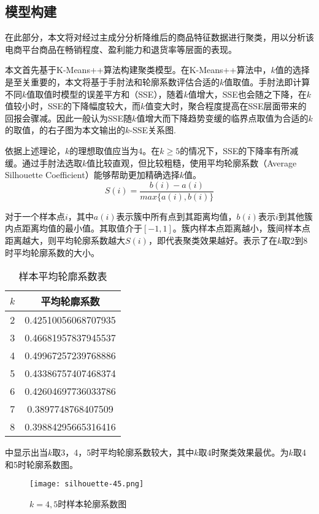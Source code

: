 \documentclass[lang=cn,11pt,a4paper,cite=authoryear]{elegantpaper}
\begin{document}
\subsection{模型构建}
在此部分，本文将对经过主成分分析降维后的商品特征数据进行聚类，用以分析该电商平台商品在畅销程度、盈利能力和退货率等层面的表现。

本文首先基于K-Means++算法构建聚类模型。在K-Means++算法中，$k$值的选择是至关重要的，本文将基于手肘法和轮廓系数评估合适的$k$值取值。手肘法即计算不同$k$值取值时模型的误差平方和（SSE），随着$k$值增大，SSE也会随之下降，在$k$值较小时，SSE的下降幅度较大，而$k$值变大时，聚合程度提高在SSE层面带来的回报会骤减。因此一般认为SSE随$k$值增大而下降趋势变缓的临界点取值为合适的$k$的取值，的右子图为本文输出的$k$-SSE关系图.

依据上述理论，$k$的理想取值应当为4。在$k \geqslant 5$的情况下，SSE的下降率有所减缓。通过手肘法选取$k$值比较直观，但比较粗糙，使用平均轮廓系数（Average Silhouette Coefficient）能够帮助更加精确选择$k$值。
\begin{equation}
  S(i) = \frac{b(i)-a(i)}{max \{a(i), b(i) \}}
\end{equation}

对于一个样本点$i$，其中$a(i)$表示簇中所有点到其距离均值，$b(i)$表示$i$到其他簇内点距离均值的最小值。其取值介于$[-1, 1]$。簇内样本点距离越小，簇间样本点距离越大，则平均轮廓系数越大$S(i)$，即代表聚类效果越好。表示了在$k$取2到8时平均轮廓系数的大小。
\begin{table}[!htb]
  \centering
  \caption{样本平均轮廓系数表}
    \huge
    \begin{tabular}{c|c}
    \hline
    \textbf{$k$} & \textbf{平均轮廓系数} \\
    \hline
    2 & 0.42510056068707935 \\
    3 & 0.46681957837945537 \\
    4 & 0.49967257239768886 \\
    5 & 0.43386757407468374 \\
    6 & 0.42604697736033786 \\
    7 & 0.3897748768407509  \\
    8 & 0.39884295665316416 \\
    \hline
    \end{tabular}
  \label{平均轮廓系数表}
\end{table}

中显示出当$k$取3，4，5时平均轮廓系数较大，其中$k$取4时聚类效果最优。为$k$取4和5时轮廓系数图。
\begin{figure}[H]
  \centering
  \texttt{[image: silhouette-45.png]}
  \caption{$k=4,5$时样本轮廓系数图}
  \label{平均轮廓系数}
\end{figure}
\end{document}
